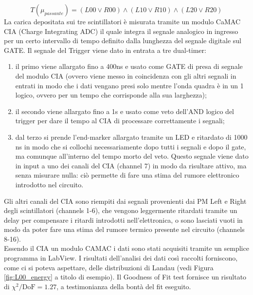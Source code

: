 \begin{equation}
  T (\mu_{passante})=(L00 \lor R00) \land (L10 \lor R10) \land (L20 \lor R20)
\end{equation}
La carica depositata sui tre scintillatori \`e misurata tramite un modulo CaMAC CIA (Charge Integrating ADC) il quale integra il segnale analogico in ingresso per un certo intervallo di tempo definito dalla lunghezza del segnale digitale sul GATE. Il segnale del Trigger viene dato in entrata a tre dual-timer:
\begin{enumerate}
	\item il primo viene allargato fino a 400ns e usato come GATE di presa di segnale del modulo CIA (ovvero viene messo in coincidenza con gli altri segnali in entrati in modo che i dati vengano presi solo mentre l'onda quadra \`e in un 1 logico, ovvero per un tempo che corrisponde alla sua larghezza);
	\item il secondo viene allargato fino a 1s e usato come veto dell'AND logico del trigger per dare il tempo al CIA di processare correttamente i segnali;
	\item dal terzo si prende l'end-marker allargato tramite un LED e ritardato di 1000 ns in modo che si collochi necessariamente dopo tutti i segnali e dopo il gate, ma comunque all'interno del tempo morto del veto. Questo segnale viene dato in input a uno dei canali del CIA (channel 7) in modo da risultare attivo, ma senza misurare nulla: ci\`o permette di fare una stima del rumore elettronico introdotto nel circuito.
\end{enumerate}

Gli altri canali del CIA sono riempiti dai segnali provenienti dai PM Left e Right degli scintillatori (channels 1-6), che vengono leggermente ritardati tramite un delay per compensare i ritardi introdotti nell'elettronica, o sono lasciati vuoti in modo da poter fare una stima del rumore termico presente nel circuito (channels 8-16).\\
Essendo il CIA un modulo CAMAC i dati sono stati acquisiti tramite un semplice programma in LabView. I risultati dell'analisi dei dati cos\`i raccolti forniscono, come ci si poteva aspettare, delle distribuzioni di Landau (vedi Figura \ref{fig:L00_energy} a titolo di esempio). Il Goodness of Fit test fornisce un risultato di $\chi^{2}/\text{DoF}=1.27$, a testimonianza della bont\`a del fit eseguito.


